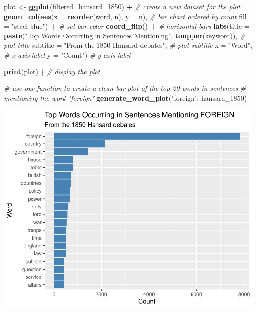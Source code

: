 \documentclass[
]{article}
\newenvironment{Shaded}{\begin{snugshade}}{\end{snugshade}}
\newcommand{\AttributeTok}[1]{\textcolor[rgb]{0.13,0.29,0.53}{#1}}
\newcommand{\CommentTok}[1]{\textcolor[rgb]{0.56,0.35,0.01}{\textit{#1}}}
\newcommand{\FunctionTok}[1]{\textcolor[rgb]{0.13,0.29,0.53}{\textbf{#1}}}
\newcommand{\NormalTok}[1]{#1}
\newcommand{\OtherTok}[1]{\textcolor[rgb]{0.56,0.35,0.01}{#1}}
\newcommand{\SpecialCharTok}[1]{\textcolor[rgb]{0.81,0.36,0.00}{\textbf{#1}}}
\newcommand{\StringTok}[1]{\textcolor[rgb]{0.31,0.60,0.02}{#1}}
\begin{document}
\begin{Shaded}
\begin{Highlighting}[]
\NormalTok{    plot }\OtherTok{\textless{}{-}} \FunctionTok{ggplot}\NormalTok{(filtered\_hansard\_1850) }\SpecialCharTok{+} \CommentTok{\# create a new dataset for the plot                       }
      \FunctionTok{geom\_col}\NormalTok{(}\FunctionTok{aes}\NormalTok{(}\AttributeTok{x =} \FunctionTok{reorder}\NormalTok{(word, n), }\AttributeTok{y =}\NormalTok{ n), }\CommentTok{\# bar chart ordered by count}
               \AttributeTok{fill =} \StringTok{"steel blue"}\NormalTok{) }\SpecialCharTok{+} \CommentTok{\# set bar color}
      \FunctionTok{coord\_flip}\NormalTok{() }\SpecialCharTok{+} \CommentTok{\# horizontal bars}
      \FunctionTok{labs}\NormalTok{(}\AttributeTok{title =} \FunctionTok{paste}\NormalTok{(}\StringTok{"Top Words Occurring in Sentences Mentioning"}\NormalTok{, }
                         \FunctionTok{toupper}\NormalTok{(keyword)), }\CommentTok{\# plot title}
           \AttributeTok{subtitle =} \StringTok{"From the 1850 Hansard debates"}\NormalTok{, }\CommentTok{\# plot subtitle}
           \AttributeTok{x =} \StringTok{"Word"}\NormalTok{, }\CommentTok{\# x{-}axis label}
           \AttributeTok{y =} \StringTok{"Count"}\NormalTok{) }\CommentTok{\# y{-}axis label}
    
    \FunctionTok{print}\NormalTok{(plot) \} }\CommentTok{\# display the plot}
\end{Highlighting}
\end{Shaded}

\begin{Shaded}
\begin{Highlighting}[]
\CommentTok{\# use our function to create a clean bar plot of the top 20 words in sentences }
\CommentTok{\# mentioning the word "foreign"}
\FunctionTok{generate\_word\_plot}\NormalTok{(}\StringTok{"foreign"}\NormalTok{, hansard\_1850)}
\end{Highlighting}
\end{Shaded}

\includegraphics[width=0.8\linewidth]{ch1-11.25.2024_files/figure-latex/unnamed-chunk-41-1}
\end{document}

